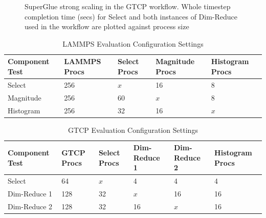 \begin{figure}
  \centering
  \vspace{-0.17in}
  
  \vspace{-0.17in}
  
  \vspace{-0.06in}
  \caption{SuperGlue strong scaling in the GTCP workflow. Whole timestep
    completion time (secs) for Select and both instances of Dim-Reduce used in
    the workflow are plotted against process size}
  \label{fig:gtcp-strong}
  \vspace{-0.25in}
\end{figure}

  

\begin{table}[tbp]
\centering
\caption{LAMMPS Evaluation Configuration Settings}
\label{tab:eval-strong-lammps}
\vspace{-0.15in}
\begin{tabular}{|l|l|l|l|l|}
\hline
Component Test & LAMMPS Procs & Select Procs & Magnitude Procs & Histogram Procs \\
\hline
Select & 256 & $x$ & 16 & 8\\
\hline
Magnitude & 256 & 60 & $x$ & 8\\
\hline
Histogram & 256 & 32 & 16 & $x$\\
\hline
\end{tabular}
\end{table}


\begin{table}[tbp]
\centering
\caption{GTCP Evaluation Configuration Settings}
\label{tab:eval-strong-gtcp}
\vspace{-0.15in}
\begin{tabular}{|l|l|l|l|l|l|}
\hline
Component Test & GTCP Procs & Select Procs & Dim-Reduce 1 & Dim-Reduce 2 & Histogram Procs \\
\hline
Select & 64 & $x$ & 4 & 4 & 4\\
\hline
Dim-Reduce 1 & 128 & 32 & $x$ & 16 & 16\\
\hline
Dim-Reduce 2 & 128 & 32 & 16 & $x$ & 16\\
\hline
\end{tabular}
\vspace{-0.07in}
\end{table}

